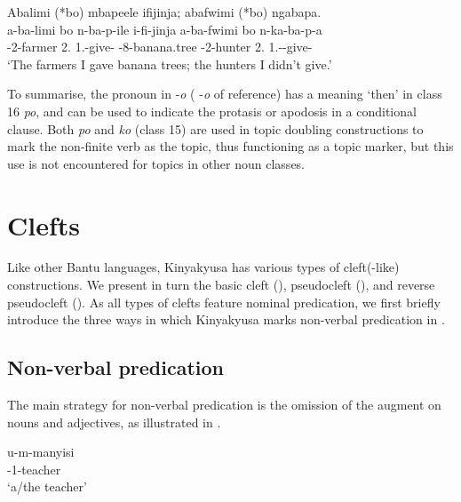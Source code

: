 \documentclass[output=paper]{langscibook}
\begin{document}
\ea
\label{bkm:Ref123743976}
Abalimi (*bo) mbapeele ifijinja; abafwimi (*bo) ngabapa.\\
\gll
a-ba-limi  bo  n-ba-p-ile  i-fi-jinja  a-ba-fwimi  bo  n-ka-ba-p-a \\
\AUG{}-2-farmer  2.\PRO{}  1\SG.\OM{}-give-\PFV{}  \AUG{}-8-banana.tree \AUG{}-2-hunter  2.\PRO{}  1\SG.\SM-\OM{}-give-\FV{} \\
\glt
‘The farmers I gave banana trees; the hunters I didn’t give.’\\

\z


To summarise, the pronoun in -\textit{o} ( \mbox{-\textit{o}} of reference) has a meaning ‘then’ in class 16 \textit{po}, and can be used to indicate the protasis or apodosis in a conditional clause. Both \textit{po} and \textit{ko} (class 15) are used in topic doubling constructions to mark the non-finite verb as the topic, thus functioning as a topic marker, but this use is not encountered for topics in other noun classes.

\section{Clefts}
\label{bkm:Ref136514487}
Like other Bantu languages, Kinyakyusa has various types of cleft(-like) constructions. We present in turn the basic cleft (), pseudocleft (), and reverse pseudocleft (). As all types of clefts feature nominal predication, we first briefly introduce the three ways in which Kinyakyusa marks non-verbal predication in .

\subsection{Non-verbal predication}
\label{bkm:Ref122533698}
The main strategy for non-verbal predication is the omission of the augment on nouns and adjectives, as illustrated in .

\ea
\label{bkm:Ref122533754}
\ea
\label{bkm:Ref122533754:a}
\gll
u-m-manyisi\\
\AUG{}-1-teacher\\
\glt
‘a/the teacher’\\
\end{document}
